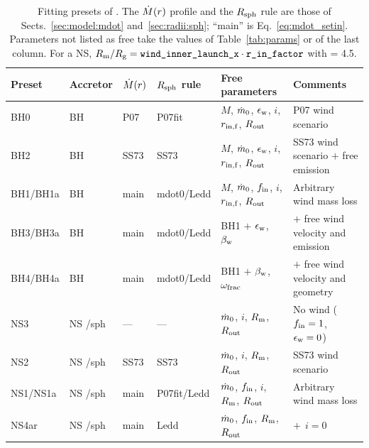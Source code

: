 \begin{table}
\centering
\caption{Fitting presets of . The $\dot M(r)$ profile and the $R_{\rm sph}$ rule are those of Sects.~\ref{sec:model:mdot} and~\ref{sec:radii:sph}; ``main'' is Eq.~\eqref{eq:mdot_setin}. Parameters not listed as free take the values of Table~\ref{tab:params} or of the last column. For a NS, $R_{\rm m}/R_{\rm g} = \texttt{wind\_inner\_launch\_x}\cdot\texttt{r\_in\_factor}$ with  = 4.5.}
\label{tab:fitpresets}
\footnotesize
\begin{tabular}{@{}llllll@{}}
\toprule
Preset & Accretor & $\dot M(r)$ & $R_{\rm sph}$ rule & Free parameters & Comments \\
\midrule
BH0 & BH & P07 & P07fit & $M$, $\dot m_0$, $\epsilon_{\rm w}$, $i$, $r_{\rm in,f}$, $R_{\rm out}$ &   P07 wind scenario \\
BH2 & BH & SS73 & SS73 & $M$, $\dot m_0$, $\epsilon_{\rm w}$, $i$, $r_{\rm in,f}$, $R_{\rm out}$ & SS73 wind scenario $+$ free emission 
\\
BH1/BH1a & BH & main & mdot0/Ledd & $M$, $\dot m_0$, $f_{\rm in}$, $i$, $r_{\rm in,f}$, $R_{\rm out}$ & Arbitrary wind mass loss\\
BH3/BH3a & BH & main & mdot0/Ledd & BH1 $+$ $\epsilon_{\rm w}$, $\beta_{\rm w}$ & $+$ free wind velocity and emission\\
BH4/BH4a & BH & main & mdot0/Ledd & BH1 $+$ $\beta_{\rm w}$, $\omega_{\rm frac}$ & $+$ free wind velocity and geometry \\
\midrule
NS3 & NS /sph & --- & --- &
$\dot m_0$, $i$, $R_{\rm m}$, $R_{\rm out}$ & No wind ($f_{\rm in} = 1$, $\epsilon_{\rm w}=0$)\\
NS2 & NS /sph & SS73 & SS73 & $\dot m_0$, $i$, $R_{\rm m}$, $R_{\rm out}$ & SS73 wind scenario \\
NS1/NS1a & NS /sph & main & P07fit/Ledd & $\dot m_0$, $f_{\rm in}$, $i$, $R_{\rm m}$, $R_{\rm out}$ & Arbitrary wind mass loss \\
NS4ar & NS /sph & main & Ledd & $\dot m_0$, $f_{\rm in}$, $R_{\rm m}$, $R_{\rm out}$ & $ + ~~i = 0$ \\

\end{tabular}
\end{table}
